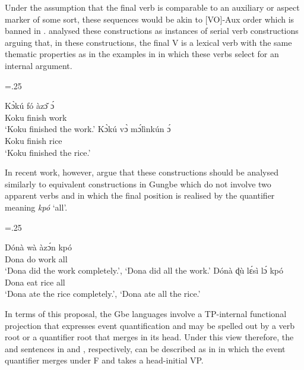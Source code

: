 \documentclass[output=paper]{langsci/langscibook}
\begin{document}
Under the assumption that the final verb is comparable to an auxiliary or
aspect marker of some sort, these sequences would be akin to [VO]-Aux order
which is banned in  \parencite[cf.][173]{BibHolRob2014}.
 analysed these constructions as instances of serial verb
constructions arguing that, in these constructions, the final V is a
lexical verb with the same thematic properties as in the examples in
 in which these verbs select for an internal argument.

\ea\label{ex:aboh:14.8}  \parencite[363]{DaCruz1995}
    \multicolsep=.25\baselineskip
    \begin{multicols}{2}
    \ea\label{ex:aboh:14.8a}
        \gll    K\`ɔkú fó àz\v{ɔ} \'ɔ \\
                Koku finish work \Det{} \\
        \glt    \enquote*{Koku finished the work.}
    \ex\label{ex:aboh:14.8b}
        \gll    K\`ɔkú v\`ɔ m\'ɔlìnkún \'ɔ \\
                Koku finish rice \Det{} \\
        \glt    \enquote*{Koku finished the rice.}
    \z
    \end{multicols}
\z

In recent work, however, \citet{VandenBergAboh2013} argue that these
constructions should be analysed similarly to equivalent constructions in
Gungbe which do not involve two apparent verbs and in which the final position
is realised by the quantifier meaning \textit{kpó} ‘all’.

\ea\label{ex:aboh:14.9} 
    \multicolsep=.25\baselineskip
    \begin{multicols}{2}
    \ea\label{ex:aboh:14.9a}
        \gll    Dónà wà àz\'ɔn kpó \\
                Dona do work all \\
        \glt    \enquote*{Dona did the work completely.}, \enquote*{Dona did
                all the work.}
    \ex\label{ex:aboh:14.9b}
        \gll    Dónà ɖù l\'ɛsì l\'ɔ kpó \\
                Dona eat rice \Det{} all \\
        \glt    \enquote*{Dona ate the rice completely.}, \enquote*{Dona ate
                all the rice.}
    \z
    \end{multicols}
\z

In terms of this proposal, the Gbe languages involve a TP-internal functional
projection that expresses event quantification and may be spelled out by a verb
root or a quantifier root that merges in its head. Under this view therefore,
the  and  sentences in  and ,
respectively, can be described as in  in which the event
quantifier merges under F and takes a head-initial VP.
\end{document}

